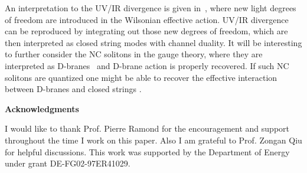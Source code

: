 \documentclass[a4paper,a4paper]{article}
\begin{document}
An interpretation to the UV/IR divergence is given in~\cite{RS2}, 
where new light degrees of freedom are introduced in the Wilsonian effective action. 
UV/IR divergence can be reproduced by integrating out those new degrees of freedom, 
which are then interpreted as closed string modes with channel duality.  
It will be interesting to further consider the NC solitons in the gauge theory, 
where they are interpreted as D-branes~\cite{MinUnstable,HarveyDbrane} and 
D-brane action is properly 
recovered. If such NC solitons are quantized one might be able to recover the effective 
interaction between D-branes and closed strings . 

 
\vskip 3cm
\centerline{\bf Acknowledgments} 
\vskip 0.3cm
I would like to thank Prof. 
Pierre Ramond for the encouragement and support throughout the time I work on this  
paper. Also I am grateful to Prof. Zongan Qiu for helpful discussions. This 
work was supported by the Department of Energy under grant
DE-FG02-97ER41029.
\end{document}
